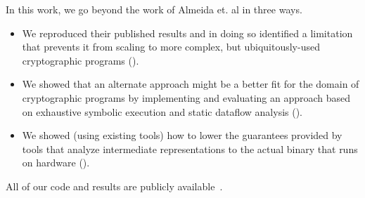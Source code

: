 In this work, we go beyond the work of Almeida et. al in three ways.  
\begin{itemize}
	\item We reproduced their published results and in doing so identified a limitation that prevents it from scaling to more complex, but ubiquitously-used cryptographic programs ().
	\item We showed that an alternate approach might be a better fit for the domain of cryptographic programs by implementing and evaluating an approach based on exhaustive symbolic execution and static dataflow analysis ().
	\item We showed (using existing tools) how to lower the guarantees provided by tools that analyze intermediate representations to the actual binary that runs on hardware ().
\end{itemize}


All of our code and results are publicly available~\cite{code-repo}.
